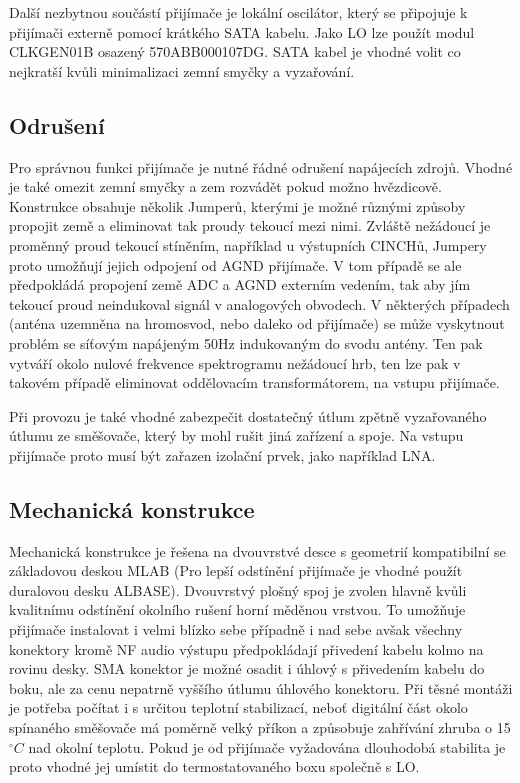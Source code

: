 \documentclass[12pt,a4paper,oneside]{article}
\begin{document}


Další nezbytnou součástí přijímače je lokální oscilátor, který se připojuje k přijímači externě pomocí krátkého SATA kabelu. Jako LO lze použít modul CLKGEN01B osazený 570ABB000107DG. SATA kabel je vhodné volit co nejkratší kvůli minimalizaci zemní smyčky a vyzařování.


\subsection{Odrušení}
Pro správnou funkci přijímače je nutné řádné odrušení napájecích zdrojů. Vhodné je také omezit zemní smyčky a zem rozvádět pokud možno hvězdicově. Konstrukce obsahuje několik Jumperů, kterými je možné různými způsoby propojit země a eliminovat tak proudy tekoucí mezi nimi. Zvláště nežádoucí je proměnný proud tekoucí stíněním, například u výstupních CINCHů, Jumpery proto umožňují jejich odpojení od AGND přijímače. V tom případě se ale předpokládá propojení země ADC a AGND externím vedením, tak aby jím tekoucí proud neindukoval signál v analogových obvodech.
V některých případech (anténa uzemněna na hromosvod, nebo daleko od přijímače) se může vyskytnout problém se síťovým napájeným 50Hz indukovaným do svodu antény. Ten pak vytváří okolo nulové frekvence spektrogramu nežádoucí hrb, ten lze pak v takovém případě eliminovat oddělovacím transformátorem, na vstupu přijímače.     

Při provozu je také vhodné zabezpečit dostatečný útlum zpětně vyzařovaného útlumu ze směšovače, který by mohl rušit jiná zařízení a spoje. Na vstupu přijímače proto musí být zařazen izolační prvek, jako například LNA. 

\subsection{Mechanická konstrukce}

Mechanická konstrukce je řešena na dvouvrstvé desce s geometrií kompatibilní se základo\-vou deskou MLAB (Pro lepší odstínění přijímače je vhodné použít duralovou desku ALBASE). Dvouvrstvý plošný spoj je zvolen hlavně kvůli kvalitnímu odstínění okolního rušení horní měděnou vrstvou. To umožňuje přijímače instalovat i velmi blízko sebe případně i nad sebe avšak všechny konektory  kromě NF audio výstupu předpokládají přivedení kabelu kolmo na rovinu desky. SMA konektor je možné osadit i úhlový s přivede\-ním kabelu do boku, ale za cenu nepatrně vyššího útlumu úhlového konektoru. Při těsné montáži je potřeba počítat i s určitou teplotní stabilizací, neboť digitální část okolo spínaného směšovače má poměrně velký příkon a způsobuje zahřívání zhruba o 15$^\circ C$ nad okolní teplotu. Pokud je od přijímače vyžadována dlouhodobá stabilita je proto vhodné jej umístit do termostatovaného boxu společně s LO.
\end{document}
